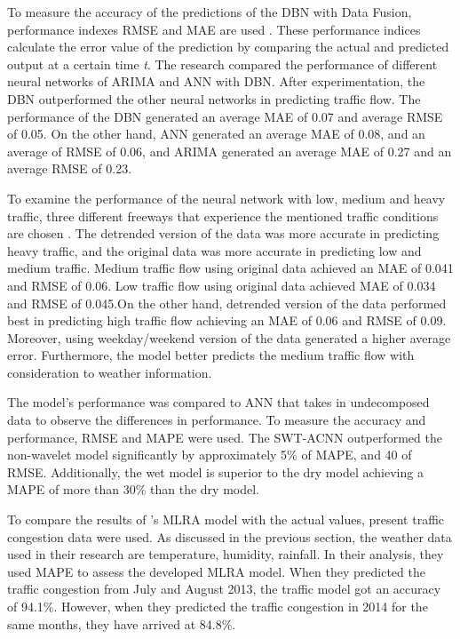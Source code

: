 To measure the accuracy of the predictions of the DBN with Data Fusion, performance indexes RMSE and MAE are used . These performance indices calculate the error value of the prediction by comparing the actual and predicted output at a certain time \textit{t}. The research compared the performance of different neural networks of ARIMA and ANN with DBN. After experimentation, the DBN outperformed the other neural networks in predicting traffic flow. The performance of the DBN generated an average MAE of 0.07 and average RMSE of 0.05. On the other hand, ANN generated an average MAE of 0.08, and an average of RMSE of 0.06, and ARIMA generated an average MAE of 0.27 and an average RMSE of 0.23.

To examine the performance of the neural network with low, medium and heavy traffic, three different freeways that experience the mentioned traffic conditions are chosen . The detrended version of the data was more accurate in predicting heavy traffic, and the original data was more accurate in predicting low and medium traffic. Medium traffic flow using original data achieved an MAE of 0.041 and RMSE of 0.06. Low traffic flow using original data achieved MAE of 0.034 and RMSE of 0.045.On the other hand, detrended version of the data performed best in predicting high traffic flow achieving an MAE of 0.06 and RMSE of 0.09. Moreover, using weekday/weekend version of the data generated a higher average error. Furthermore, the model better predicts the medium traffic flow with consideration to weather information.

The model’s performance was compared to ANN that takes in undecomposed data to observe the differences in performance. To measure the accuracy and performance, RMSE and MAPE were used. The SWT-ACNN outperformed the non-wavelet model significantly by approximately 5\% of MAPE, and 40 of RMSE. Additionally, the wet model is superior to the dry model achieving a MAPE of more than 30\% than the dry model.

To compare the results of ’s MLRA model with the actual values, present traffic congestion data were used. As discussed in the previous section, the weather data used in their research are temperature, humidity, rainfall. In their analysis, they used MAPE to assess the developed MLRA model. When they predicted the traffic congestion from July and August 2013, the traffic model got an accuracy of 94.1\%. However, when they predicted the traffic congestion in 2014 for the same months, they have arrived at 84.8\%. %




